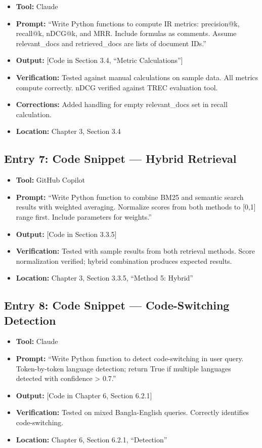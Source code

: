 \documentclass[12pt,a4paper]{report}
\begin{document}
\begin{itemize}
    \item \textbf{Tool:} Claude
    \item \textbf{Prompt:} ``Write Python functions to compute IR metrics: precision@k, recall@k, nDCG@k, and MRR. Include formulas as comments. Assume relevant\_docs and retrieved\_docs are lists of document IDs.''
    \item \textbf{Output:} [Code in Section 3.4, ``Metric Calculations'']
    \item \textbf{Verification:} Tested against manual calculations on sample data. All metrics compute correctly. nDCG verified against TREC evaluation tool.
    \item \textbf{Corrections:} Added handling for empty relevant\_docs set in recall calculation.
    \item \textbf{Location:} Chapter 3, Section 3.4
\end{itemize}

\subsection{Entry 7: Code Snippet --- Hybrid Retrieval}

\begin{itemize}
    \item \textbf{Tool:} GitHub Copilot
    \item \textbf{Prompt:} ``Write Python function to combine BM25 and semantic search results with weighted averaging. Normalize scores from both methods to [0,1] range first. Include parameters for weights.''
    \item \textbf{Output:} [Code in Section 3.3.5]
    \item \textbf{Verification:} Tested with sample results from both retrieval methods. Score normalization verified; hybrid combination produces expected results.
    \item \textbf{Location:} Chapter 3, Section 3.3.5, ``Method 5: Hybrid''
\end{itemize}

\subsection{Entry 8: Code Snippet --- Code-Switching Detection}

\begin{itemize}
    \item \textbf{Tool:} Claude
    \item \textbf{Prompt:} ``Write Python function to detect code-switching in user query. Token-by-token language detection; return True if multiple languages detected with confidence > 0.7.''
    \item \textbf{Output:} [Code in Chapter 6, Section 6.2.1]
    \item \textbf{Verification:} Tested on mixed Bangla-English queries. Correctly identifies code-switching.
    \item \textbf{Location:} Chapter 6, Section 6.2.1, ``Detection''
\end{itemize}
\end{document}
